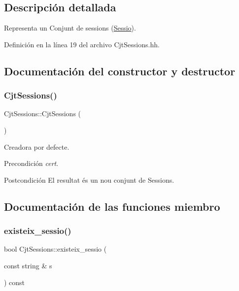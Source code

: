 \subsection{Descripción detallada}
Representa un Conjunt de sessions (\mbox{\hyperlink{class_sessio}{Sessio}}). 

Definición en la línea 19 del archivo Cjt\+Sessions.\+hh.



\subsection{Documentación del constructor y destructor}
\mbox{\label{class_cjt_sessions_acfe3023a40e3dcbfeb558466a013ca87}} 
\subsubsection{\texorpdfstring{Cjt\+Sessions()}{CjtSessions()}}
{\footnotesize\ttfamily Cjt\+Sessions\+::\+Cjt\+Sessions (\begin{DoxyParamCaption}{ }\end{DoxyParamCaption})}



Creadora por defecte. 

\begin{DoxyPrecond}{Precondición}
{\itshape cert}. 
\end{DoxyPrecond}
\begin{DoxyPostcond}{Postcondición}
El resultat és un nou conjunt de Sessions. 
\end{DoxyPostcond}


\subsection{Documentación de las funciones miembro}
\mbox{\label{class_cjt_sessions_ae0d6dfe6e1bab2746fa03dc852f2f4a9}} 
\subsubsection{\texorpdfstring{existeix\+\_\+sessio()}{existeix\_sessio()}}
{\footnotesize\ttfamily bool Cjt\+Sessions\+::existeix\+\_\+sessio (\begin{DoxyParamCaption}\item[{const string \&}]{s }\end{DoxyParamCaption}) const}



